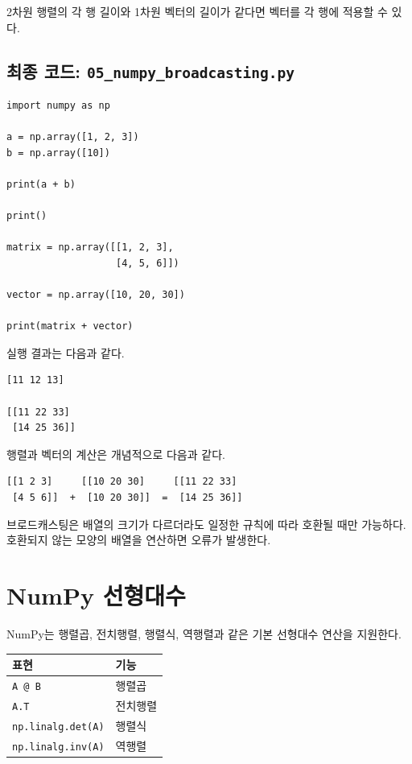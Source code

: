 \documentclass[11pt,a4paper]{article}
\begin{document}
2차원 행렬의 각 행 길이와 1차원 벡터의 길이가 같다면 벡터를 각 행에 적용할 수 있다.

\subsection{최종 코드: \texttt{05\_numpy\_broadcasting.py}}

\begin{lstlisting}
import numpy as np

a = np.array([1, 2, 3])
b = np.array([10])

print(a + b)

print()

matrix = np.array([[1, 2, 3],
                   [4, 5, 6]])

vector = np.array([10, 20, 30])

print(matrix + vector)
\end{lstlisting}

실행 결과는 다음과 같다.

\begin{verbatim}
[11 12 13]

[[11 22 33]
 [14 25 36]]
\end{verbatim}

행렬과 벡터의 계산은 개념적으로 다음과 같다.

\begin{verbatim}
[[1 2 3]     [[10 20 30]     [[11 22 33]
 [4 5 6]]  +  [10 20 30]]  =  [14 25 36]]
\end{verbatim}

\begin{importantbox}
브로드캐스팅은 배열의 크기가 다르더라도 일정한 규칙에 따라 호환될 때만 가능하다. 호환되지 않는 모양의 배열을 연산하면 오류가 발생한다.
\end{importantbox}

\section{NumPy 선형대수}

NumPy는 행렬곱, 전치행렬, 행렬식, 역행렬과 같은 기본 선형대수 연산을 지원한다.

\begin{center}
\begin{tabular}{ll}
\toprule
표현 & 기능 \\
\midrule
\texttt{A @ B} & 행렬곱 \\
\texttt{A.T} & 전치행렬 \\
\texttt{np.linalg.det(A)} & 행렬식 \\
\texttt{np.linalg.inv(A)} & 역행렬 \\
\bottomrule
\end{tabular}
\end{center}
\end{document}
